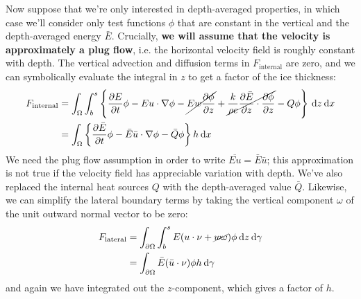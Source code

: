 \documentclass{article}
\theoremstyle{definition}
\theoremstyle{plain}
\newcommand{\ud}{\hspace{2pt}\mathrm{d}}
\begin{document}
Now suppose that we're only interested in depth-averaged properties, in which case we'll consider only test functions $\phi$ that are constant in the vertical and the depth-averaged energy $\bar E$.
Crucially, \textbf{we will assume that the velocity is approximately a plug flow}, i.e. the horizontal velocity field is roughly constant with depth.
The vertical advection and diffusion terms in $F_{\text{internal}}$ are zero, and we can symbolically evaluate the integral in $z$ to get a factor of the ice thickness:
\begin{align}
    F_{\text{internal}} & = \int_\Omega\int_b^s\left\{\frac{\partial E}{\partial t}\phi - E u\cdot\nabla\phi - \cancel{E w\frac{\partial\phi}{\partial z}} + \cancel{\frac{k}{\rho c}\frac{\partial \bar E}{\partial z}\cdot\frac{\partial\phi}{\partial z}} - Q\phi\right\}\ud z\ud x \nonumber\\
    & = \int_\Omega\left\{\frac{\partial \bar E}{\partial t}\phi - \bar E\bar u\cdot\nabla\phi - \bar Q\phi\right\}h\ud x
\end{align}
We need the plug flow assumption in order to write $\overline{Eu} = \bar{E}\bar{u}$; this approximation is not true if the velocity field has appreciable variation with depth.
We've also replaced the internal heat sources $Q$ with the depth-averaged value $\bar Q$.
Likewise, we can simplify the lateral boundary terms by taking the vertical component $\omega$ of the unit outward normal vector to be zero:
\begin{align}
    F_{\text{lateral}} & = \int_{\partial\Omega}\int_b^s E(u\cdot\nu + \cancel{w\omega})\phi \ud z\ud\gamma \nonumber\\
    & = \int_{\partial\Omega}\bar E(\bar u\cdot\nu)\phi h\ud\gamma
\end{align}
and again we have integrated out the $z$-component, which gives a factor of $h$.
\end{document}
